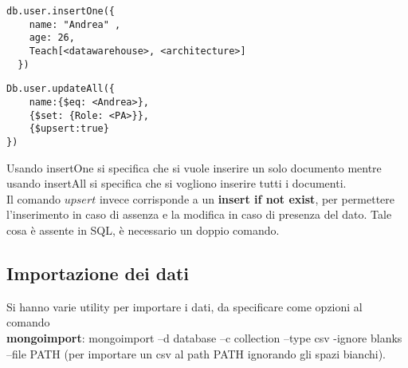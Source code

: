 \begin{minipage}{.50\textwidth}
\begin{lstlisting}[caption = operazione di Insert]
db.user.insertOne({
    name: "Andrea" ,
    age: 26,
    Teach[<datawarehouse>, <architecture>]
  })
\end{lstlisting}
\end{minipage}\hfill
\begin{minipage}{.50\textwidth}
\begin{lstlisting}[caption = operazione di Update]
Db.user.updateAll({
    name:{$eq: <Andrea>},
    {$set: {Role: <PA>}},
    {$upsert:true}
})
\end{lstlisting}
\end{minipage}
Usando insertOne si specifica che si vuole inserire un solo documento mentre usando insertAll si specifica che si vogliono inserire tutti i documenti.\\
Il comando $upsert$ invece corrisponde a un \textbf{insert if not exist}, per permettere l’inserimento in caso di assenza e la modifica in caso di presenza del dato. Tale cosa è assente in SQL, è necessario un doppio comando.

\subsection{Importazione dei dati}
Si hanno varie utility per importare i dati, da specificare come opzioni al comando\\ \textbf{mongoimport}: mongoimport –d database –c collection –type csv -ignore blanks –file PATH (per importare un csv al path PATH ignorando gli spazi bianchi).

